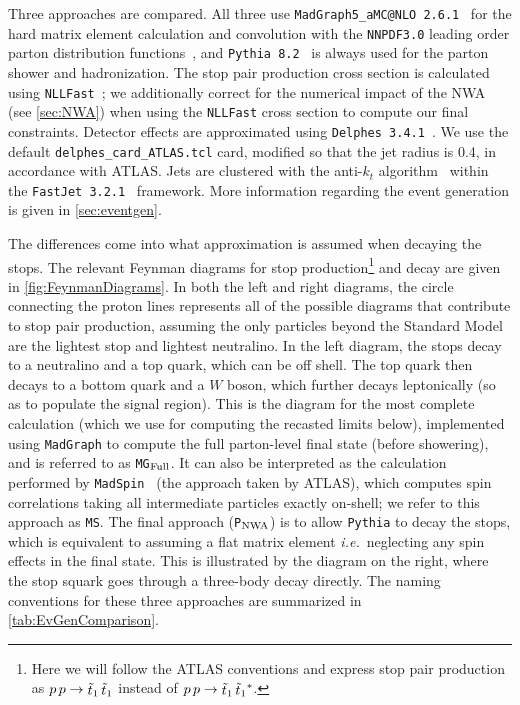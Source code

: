 \documentclass[a4paper,12pt]{article}
\newcommand{\pythia}{\texttt{P}$_{\rm{NWA}}$}
\newcommand{\mg}{\texttt{MG}$_{\rm{Full}}$}
\newcommand{\ms}{\texttt{MS}}
\def\stopone{\ensuremath{\mathchoice%
      {\displaystyle\raise.0ex\hbox{$\displaystyle\tilde t_1$}}%
         {\textstyle\raise-.2ex\hbox{$\textstyle\tilde t_1$}}%
       {\scriptstyle\raise.0ex\hbox{$\scriptstyle\tilde t_1$}}%
 {\scriptscriptstyle\raise.0ex\hbox{$\scriptscriptstyle\tilde t_1$}}}}
\begin{document}
Three approaches are compared.  All three use \texttt{MadGraph5\_aMC@NLO 2.6.1}~\cite{Alwall:2014hca} for the hard matrix element calculation and convolution with the \texttt{NNPDF3.0} leading order parton distribution functions~\cite{Ball:2014uwa}, and \texttt{Pythia 8.2}~\cite{Sjostrand:2014zea} is always used for the parton shower and hadronization.  The stop pair production cross section is calculated using \texttt{NLLFast}~\cite{Beenakker:2015rna, Beenakker:1996ed, Beenakker:1997ut}; we additionally correct for the numerical impact of the NWA (see \cref{sec:NWA}) when using the \texttt{NLLFast} cross section to compute our final constraints.  Detector effects are approximated using \texttt{Delphes 3.4.1}~\cite{deFavereau:2013fsa}. We use the default \texttt{delphes\_card\_ATLAS.tcl} card, modified so that the jet radius is 0.4, in accordance with ATLAS. Jets are clustered with the anti-$k_t$ algorithm~\cite{Cacciari:2005hq,Cacciari:2008gp} within the \texttt{FastJet 3.2.1}~\cite{Cacciari:2011ma} framework.   More information regarding the event generation is given in \cref{sec:eventgen}. 

The differences come into what approximation is assumed when decaying the stops.  The relevant Feynman diagrams for stop production\footnote{Here we will follow the ATLAS conventions and express stop pair production as $p\,p \rightarrow \stopone\,\stopone$ instead of $p\,p \rightarrow \stopone\, \stopone^*$.} and decay are given in \cref{fig:FeynmanDiagrams}.   In both the left and right diagrams, the circle connecting the proton lines represents all of the possible diagrams that contribute to stop pair production, assuming the only particles beyond the Standard Model are the lightest stop and lightest neutralino.   In the left diagram, the stops decay to a neutralino and a top quark, which can be off shell. The top quark then decays to a bottom quark and a $W$ boson, which further decays leptonically (so as to populate the signal region).  This is the diagram for the most complete calculation (which we use for computing the recasted limits below), implemented using \texttt{MadGraph} to compute the full parton-level final state (before showering), and is referred to as \mg.  It can also be interpreted as the calculation performed by \texttt{MadSpin}~\cite{Artoisenet:2012st} (the approach taken by ATLAS), which computes spin correlations taking all intermediate particles exactly on-shell; we refer to this approach as \ms.  The final approach (\pythia) is to allow \texttt{Pythia} to decay the stops, which is equivalent to assuming a flat matrix element \emph{i.e.}~neglecting any spin effects in the final state.  This is illustrated by the diagram on the right, where the stop squark goes through a three-body decay directly.  The naming conventions for these three approaches are summarized in \cref{tab:EvGenComparison}. 
 
\end{document}
